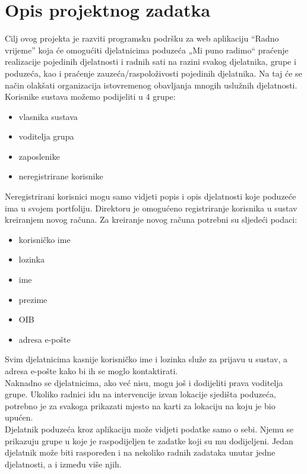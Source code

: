 \chapter{Opis projektnog zadatka}
		
		Cilj ovog projekta je razviti programsku podršku za web aplikaciju “Radno vrijeme” koja će omogućiti  djelatnicima poduzeća „Mi puno radimo“ praćenje realizacije pojedinih djelatnosti i radnih sati na razini svakog djelatnika, grupe i poduzeća, kao i praćenje zauzeća/raspoloživosti pojedinih djelatnika. Na taj će se način olakšati organizacija istovremenog obavljanja mnogih uslužnih djelatnosti.\\
		
		Korisnike sustava možemo podijeliti u 4 grupe: 
		\begin{itemize}
			\item vlasnika sustava
			\item voditelja grupa
			\item zaposlenike
			\item neregistrirane korisnike\\
		\end{itemize}
		
		Neregistrirani korisnici mogu samo vidjeti popis i opis djelatnosti koje poduzeće ima u svojem portfoliju. Direktoru je omogućeno registriranje korisnika u sustav kreiranjem novog računa. Za kreiranje novog računa potrebni su sljedeći podaci:
		\begin{itemize}
			\item korisničko ime
			\item lozinka
			\item ime
			\item prezime
			\item OIB
			\item adresa e-pošte\\
		\end{itemize} 
		
		Svim djelatnicima kasnije korisničko ime i lozinka služe za prijavu u sustav, a adresa e-pošte kako bi ih se moglo kontaktirati. \\
		
		Naknadno se djelatnicima, ako već nisu, mogu još i dodijeliti prava voditelja grupe. Ukoliko radnici idu na intervencije izvan lokacije sjedišta poduzeća, potrebno je za svakoga prikazati mjesto na karti za lokaciju na koju je bio upućen.\\ 
		
		Djelatnik poduzeća kroz aplikaciju  može vidjeti podatke samo o sebi. Njemu se prikazuju grupe u koje je raspodijeljen te zadatke koji su mu dodijeljeni. Jedan djelatnik može biti raspoređen i na nekoliko radnih zadataka unutar jedne djelatnosti, a i između više njih.\\
		
